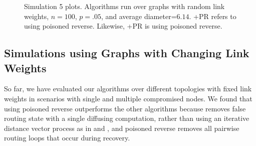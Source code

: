 \begin{figure}
\centering
\caption{Simulation 5 plots.  Algorithms run over \er graphs with random link weights, $n=100$, $p=.05$, and average diameter=$6.14$. 
\seconds+{\textsc PR} refers to \second using poisoned reverse. Likewise, \cprs+{\textsc PR} is \cpr using poisoned reverse.}
\label{fig:pr-fix}
\end{figure}




\subsection{Simulations using Graphs with Changing Link Weights}
\label{subsec:change}

So far, we have evaluated our algorithms over different topologies with fixed link weights in scenarios with single and multiple compromised nodes.
We found that \cpr using poisoned reverse outperforms the other algorithms because \cpr removes false
routing state with a single diffusing computation, rather than using an iterative distance vector process as in \second and \purges, and poisoned reverse removes
all pairwise routing loops that occur during \cpr recovery. 

